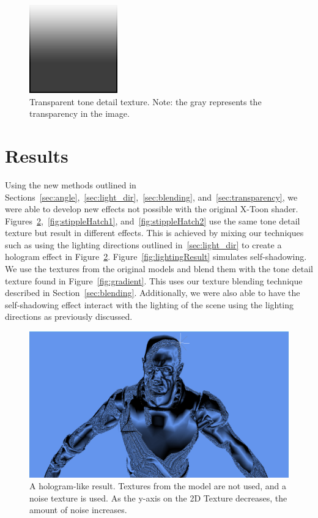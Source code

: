 \documentclass[annual]{acmsiggraph}
\begin{document}
\begin{figure}[h]
	\centering
	\includegraphics[width=1.5in]{images/xtoon_shading_alpha}
	\caption{Transparent tone detail texture. Note: the gray represents the transparency in the image.}
	\label{fig:transparent_tone}
\end{figure}

\section{Results}
\label{sec:results}
Using the new methods outlined in Sections~\ref{sec:angle},~\ref{sec:light_dir},~\ref{sec:blending}, and~\ref{sec:transparency}, we were able to develop new effects not possible with the original X-Toon shader. Figures~\ref{fig:hologram},~\ref{fig:stippleHatch1}, and~\ref{fig:stippleHatch2} use the same tone detail texture but result in different effects. This is achieved by mixing our techniques such as using the lighting directions outlined in~\ref{sec:light_dir} to create a hologram effect in Figure~\ref{fig:hologram}. Figure~\ref{fig:lightingResult} simulates self-shadowing. We use the textures from the original models and blend them with the tone detail texture found in Figure~\ref{fig:gradient}. This uses our texture blending technique described in Section~\ref{sec:blending}. Additionally, we were also able to have the self-shadowing effect interact with the lighting of the scene using the lighting directions as previously discussed.

\begin{figure}[h]
	\centering
	\includegraphics[width=5.5in]{images/hologram}
	\caption{A hologram-like result. Textures from the model are not used, and a noise texture is used. As the y-axis on the 2D Texture decreases, the amount of noise increases.}
	\label{fig:hologram}
\end{figure}
\end{document}
